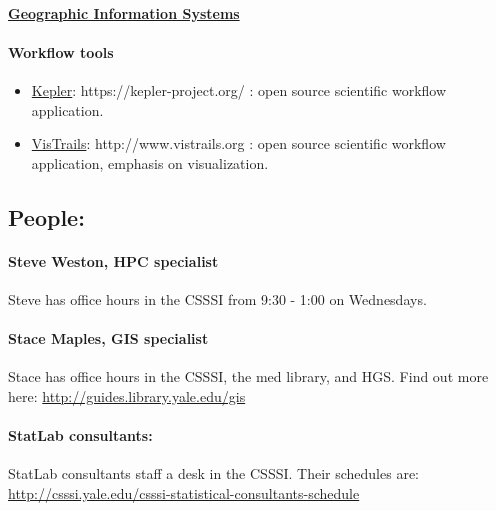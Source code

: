 \documentclass[]{article}
\begin{document}
\paragraph{\href{http://guides.library.yale.edu/gis}{Geographic
Information Systems}}\label{geographic-information-systems}

\paragraph{Workflow tools}\label{workflow-tools}

\begin{itemize}
\itemsep1pt\parskip0pt
\item
  \href{https://kepler-project.org/}{Kepler}:
  https://kepler-project.org/ : open source scientific workflow
  application.
\item
  \href{http://www.vistrails.org/index.php/Main_Page}{VisTrails}:
  http://www.vistrails.org : open source scientific workflow
  application, emphasis on visualization.
\end{itemize}

\subsection{People:}\label{people}

\paragraph{Steve Weston, HPC
specialist}\label{steve-weston-hpc-specialist}

Steve has office hours in the CSSSI from 9:30 - 1:00 on Wednesdays.

\paragraph{Stace Maples, GIS
specialist}\label{stace-maples-gis-specialist}

Stace has office hours in the CSSSI, the med library, and HGS. Find out
more here: \url{http://guides.library.yale.edu/gis}

\paragraph{StatLab consultants:}\label{statlab-consultants-1}

StatLab consultants staff a desk in the CSSSI. Their schedules are:
\url{http://csssi.yale.edu/csssi-statistical-consultants-schedule}
\end{document}

